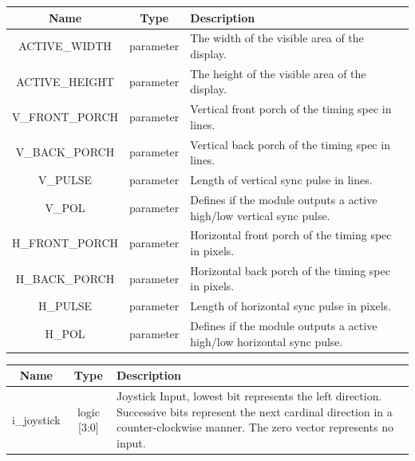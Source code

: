 \documentclass[12pt]{article}
\begin{document}
\vspace{0.5in}
\begingroup
{}
\label{tab:input_vtg}
\begin{tabularx}{\linewidth}{ ||c|c|X|| }
    \hline
    Name & Type & Description \\
    \hline
    ACTIVE\_WIDTH & parameter & The width of the visible area of the display. \\
    ACTIVE\_HEIGHT & parameter & The height of the visible area of the display.
    \\
    V\_FRONT\_PORCH & parameter & Vertical front porch of the timing spec in
    lines. \\
    V\_BACK\_PORCH & parameter & Vertical back porch of the timing spec in
    lines. \\
    V\_PULSE & parameter & Length of vertical sync pulse in lines. \\
    V\_POL & parameter & Defines if the module outputs a active high/low
    vertical sync pulse. \\
    H\_FRONT\_PORCH & parameter & Horizontal front porch of the timing spec in
    pixels. \\
    H\_BACK\_PORCH & parameter & Horizontal back porch of the timing spec in
    pixels. \\
    H\_PULSE & parameter & Length of horizontal sync pulse in pixels. \\
    H\_POL & parameter & Defines if the module outputs a active high/low
    horizontal sync pulse. \\
    \hline
\end{tabularx}
\endgroup

\vspace{0.5in}
\begingroup
{}
\label{tab:input_game_state}
\begin{tabularx}{\linewidth}{ ||c|c|X|| }
    \hline
    Name & Type & Description \\
    \hline
    i\_joystick & logic [3:0] & Joystick Input, lowest bit represents the left
    direction. Successive bits represent the next cardinal direction in a
    counter-clockwise manner. The zero vector represents no input. \\
    \hline
\end{tabularx}
\endgroup
\end{document}
